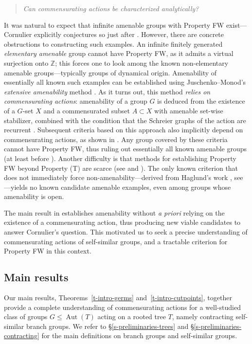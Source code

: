 \documentclass[11pt]{amsart}
\newcommand{\Z}{\ensuremath{\mathbb{Z}}}%
\newcommand{\aut}{\ensuremath{\operatorname{Aut}}}%
\theoremstyle{definition}
\theoremstyle{plain}
\newtheorem{main thm}{Theorem}
\theoremstyle{remark}
\theoremstyle{plain}
\begin{document}
\begin{quote}
\emph{Can commensurating actions be characterized analytically?} 
\end{quote}

It was  natural to expect that infinite amenable groups with Property FW exist---Cornulier explicitly conjectures so just after \cite[Question 1.11]{Cor-Piecewise}. However, there are concrete obstructions to constructing such examples. An infinite finitely generated \emph{elementary amenable} group cannot have Property FW, as it admits a virtual surjection onto $\Z$; this forces one to look among the known non-elementary amenable groups---typically groups of dynamical origin. Amenability of essentially all known such examples can be established using Juschenko--Monod's \emph{extensive amenability} method \cite{Ju-Mo}. As it turns out, this method \emph{relies on commensurating actions}: amenability of a group $G$ is deduced from the existence of a $G$-set $X$ and a commensurated subset $A\subset X$ with amenable set-wise stabilizer, combined with the condition that the Schreier graphs of the action are recurrent \cite{JNS}. Subsequent criteria based on this approach \cite{JNS, JMMS} also implicitly depend on commensurating actions, as shown in \cite{LMT, Cor-Piecewise}. Any group covered by these criteria cannot have Property FW, thus ruling out essentially all known amenable groups (at least before \cite{MNZ}). Another difficulty is that methods for establishing Property FW beyond Property (T) are scarce (see \cite{Cor-FM, Cor-FWsurvey} and \cite[p.\,2 and \S4]{Genevois}). The only known criterion that does not immediately force non-amenability---derived from Haglund's work \cite{Haglund}, see \cite[Ex.\,6.A.8]{Cor-FM}---yields no known candidate amenable examples, even among groups whose amenability is open.










The main result in   \cite{MNZ} establishes amenability without \emph{a priori} relying on the existence of a commensurating action, thus producing new viable candidates to answer Cornulier's question. This motivated us to seek a precise understanding of commensurating actions of self-similar groups, and a tractable criterion for Property FW in this context. 
\subsection*{Main results} Our main results, Theorems~\ref{t-intro-germs} and~\ref{t-intro-cutpoints}, together provide a complete understanding of commensurating actions for a well-studied class of groups $G \leq \aut(T)$ acting on a rooted tree $T$, namely {contracting self-similar branch groups}. We refer to \S\ref{s-preliminaries-trees} and \S\ref{s-preliminaries-contracting} for the main definitions on branch groups and self-similar groups.
\end{document}
